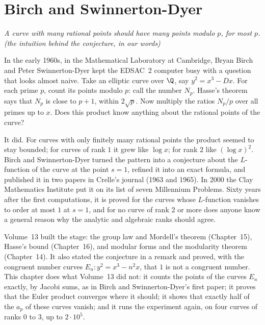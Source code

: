 \chapter{Birch and Swinnerton-Dyer}\label{conjectures:ch:bsd}

\begin{center}\itshape
A curve with many rational points should have many points modulo $p$, for most $p$.\\
\upshape(the intuition behind the conjecture, in our words)
\end{center}

In the early 1960s, in the Mathematical Laboratory at Cambridge, Bryan Birch and Peter Swinnerton-Dyer kept the EDSAC~2 computer busy with a question that
looks almost naive. Take an elliptic curve over $\Q$, say $y^2=x^3-Dx$. For each prime $p$, count its points modulo $p$: call the number $N_p$. Hasse's theorem
says that $N_p$ is close to $p+1$, within $2\sqrt p$. Now multiply the ratios $N_p/p$ over all primes up to $x$. Does this product know anything about the
rational points of the curve?

It did. For curves with only finitely many rational points the product seemed to stay bounded; for curves of rank $1$ it grew like $\log x$; for rank $2$ like
$(\log x)^2$. Birch and Swinnerton-Dyer turned the pattern into a conjecture about the $L$-function of the curve at the point $s=1$, refined it into an exact
formula, and published it in two papers in Crelle's journal (1963 and 1965). In 2000 the Clay Mathematics Institute put it on its list of seven Millennium
Problems. Sixty years after the first computations, it is proved for the curves whose $L$-function vanishes to order at most $1$ at $s=1$, and for no curve of rank $2$ or more
does anyone know a general reason why the analytic and algebraic ranks should agree.

Volume~13 built the stage: the group law and Mordell's theorem (Chapter~15), Hasse's bound (Chapter~16), and modular forms and the modularity theorem
(Chapter~14). It also stated the conjecture in a remark and proved, with the congruent number curves $E_n:y^2=x^3-n^2x$, that $1$ is not a congruent number.
This chapter does what Volume~13 did not: it counts the points of the curves $E_n$ exactly, by Jacobi sums, as in Birch and Swinnerton-Dyer's first paper; it
proves that the Euler product converges where it should; it shows that exactly half of the $a_p$ of these curves vanish; and it runs the experiment again,
on four curves of ranks $0$ to $3$, up to $2\cdot10^5$.

